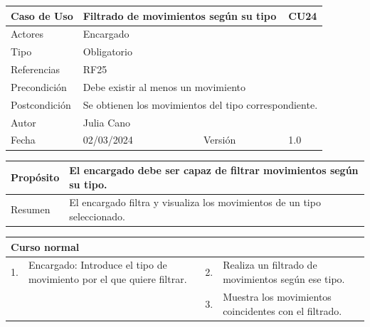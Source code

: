 \begin{table}[H]
	\centering
	\begin{tabular}{| m{} | m{} | m{} | m{}|}
		\hline
		\rowcolor{grayshade} Caso de Uso & \multicolumn{2}{|m{0.43\textwidth}|}{Filtrado de movimientos según su tipo} &  CU24\\ 
		\hline
		Actores & \multicolumn{3}{l|}{Encargado} \\ 
		\hline
		Tipo & \multicolumn{3}{l|}{Obligatorio} \\ 
		\hline
		Referencias & \multicolumn{3}{l|}{RF25} \\ 
		\hline
		Precondición & \multicolumn{3}{m{0.67\textwidth}|}{Debe existir al menos un movimiento} \\ 
		\hline
		Postcondición & \multicolumn{3}{m{0.67\textwidth}|}{Se obtienen los movimientos del tipo correspondiente.} \\ 
		\hline
		Autor & \multicolumn{3}{l|}{Julia Cano} \\ 
		\hline
		Fecha & 02/03/2024 & Versión & 1.0 \\
		\hline
	\end{tabular}
\end{table}

\begin{table}[H]
	\centering
	\begin{tabular}{| m{} | m{} | m{} | m{} |}
		\hline
		Propósito & \multicolumn{3}{m{0.67\textwidth}|}{El encargado debe ser capaz de filtrar movimientos según su tipo.}  \\ 
		\hline
		Resumen & \multicolumn{3}{m{0.67\textwidth}|}{El encargado filtra y visualiza los movimientos de un tipo seleccionado.} \\ 
		\hline
	\end{tabular}
\end{table}


\begin{table}[H]
	\centering
	\begin{tabular}{| m{} | m{} | m{} | m{} |}
		\hline
		\multicolumn{4}{|m{0.9\textwidth}|}{Curso normal}     \\ 
		\hline
		1. & Encargado: Introduce el tipo de movimiento por el que quiere filtrar. & 2. &  Realiza un filtrado de movimientos según ese tipo.  \\ 
		\hline
		&  & 3. &  Muestra los movimientos coincidentes con el filtrado.  \\ 
		\hline
	\end{tabular}
\end{table}

